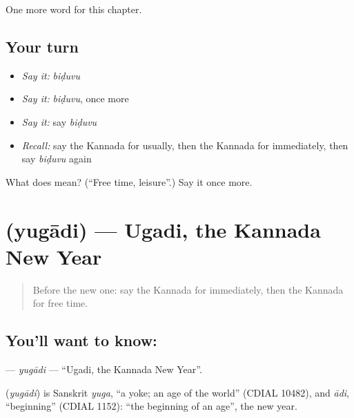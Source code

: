 \begin{grammarlens}[title={What you've built}]
One more word for this chapter.
\end{grammarlens}

\subsection*{Your turn}
\begin{itemize}
\raggedright
  \item \emph{Say it:} \emph{biḍuvu}
  \item \emph{Say it:} \emph{biḍuvu}, once more
  \item \emph{Say it:} say \emph{biḍuvu}
  \item \emph{Recall:} say the Kannada for usually, then the Kannada for immediately, then say \emph{biḍuvu} again
\end{itemize}

\begin{tcolorbox}[breakable,colback=teal!4,colframe=teal!35!black,title={Before you move on}]
What does  mean? (\textquotedblleft{}Free time, leisure\textquotedblright{}.) Say it once more.
\end{tcolorbox}
\section[\texorpdfstring{\kn{ಯುಗಾದಿ} (yugādi)}{ಯುಗಾದಿ (yugādi)}]{ (yugādi) — Ugadi, the Kannada New Year}

\label{lesson:KA-C210-yugadi}



\begin{quote}
Before the new one: say the Kannada for immediately, then the Kannada for free time.
\end{quote}

\subsection*{You'll want to know: }
\textbf{} — \emph{yugādi} — \textquotedblleft{}Ugadi, the Kannada New Year\textquotedblright{}.

\begin{cousinweb}
\textbf{} (\emph{yugādi}) is Sanskrit \emph{yuga}, \textquotedblleft{}a yoke; an age of the world\textquotedblright{} (CDIAL 10482), and \emph{ādi}, \textquotedblleft{}beginning\textquotedblright{} (CDIAL 1152): \textquotedblleft{}the beginning of an age\textquotedblright{}, the new year.
\end{cousinweb}

